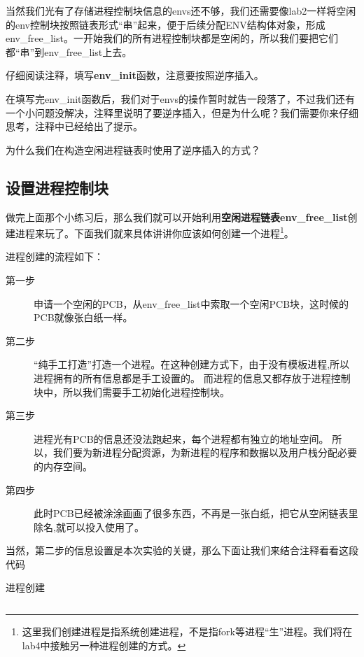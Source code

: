 当然我们光有了存储进程控制块信息的envs还不够，我们还需要像lab2一样将空闲的env控制块按照链表形式“串”起来，便于后续分配ENV结构体对象，形成env\_free\_list。一开始我们的所有进程控制块都是空闲的，所以我们要把它们都“串”到env\_free\_list上去。

\begin{exercise}
仔细阅读注释，填写\textbf{env\_init}函数，注意要按照逆序插入。
\end{exercise}

在填写完env\_init函数后，我们对于envs的操作暂时就告一段落了，不过我们还有一个小问题没解决，注释里说明了要逆序插入，但是为什么呢？我们需要你来仔细思考，注释中已经给出了提示。

\begin{thinking}\label{think-env_init}
为什么我们在构造空闲进程链表时使用了逆序插入的方式？
\end{thinking}

\subsection{设置进程控制块}

做完上面那个小练习后，那么我们就可以开始利用\textbf{空闲进程链表env\_free\_list}创建进程来玩了。下面我们就来具体讲讲你应该如何创建一个进程\footnote{这里我们创建进程是指系统创建进程，不是指fork等进程“生”进程。我们将在lab4中接触另一种进程创建的方式。}。

进程创建的流程如下：

\begin{description}
  \item[第一步] 申请一个空闲的PCB，从env\_free\_list中索取一个空闲PCB块，这时候的PCB就像张白纸一样。
  \item[第二步] “纯手工打造”打造一个进程。在这种创建方式下，由于没有模板进程,所以进程拥有的所有信息都是手工设置的。
  而进程的信息又都存放于进程控制块中，所以我们需要手工初始化进程控制块。
  \item[第三步] 进程光有PCB的信息还没法跑起来，每个进程都有独立的地址空间。\label{process-3}
  所以，我们要为新进程分配资源，为新进程的程序和数据以及用户栈分配必要的内存空间。
  \item[第四步] 此时PCB已经被涂涂画画了很多东西，不再是一张白纸，把它从空闲链表里除名,就可以投入使用了。
\end{description}

当然，第二步的信息设置是本次实验的关键，那么下面让我们来结合注释看看这段代码

\begin{codeBoxWithCaption}{进程创建\label{code:env_alloc.c}}
  \inputminted[linenos]{c}{codes/env_alloc.c}
\end{codeBoxWithCaption}

